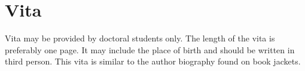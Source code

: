 \chapter*{Vita}

\doublespacing
Vita may be provided by doctoral students only. The length of the vita is preferably one page. It may include the place of birth and should be written in third person. This vita is similar to the author biography found on book jackets.

